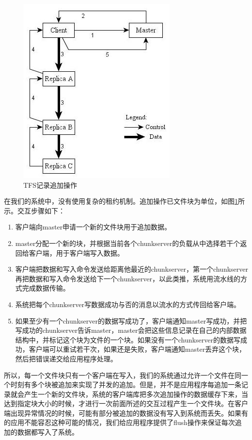 \documentclass[11pt,a4paper]{scrartcl} %
\begin{document}
\begin{CJK*}{UTF8}{gbsn}
\begin{figure}
  \centering
\includegraphics{tfs_write}  
  \caption{TFS记录追加操作}
  \label{fig:tfswrite}
\end{figure}
在我们的系统中，没有使用复杂的租约机制。追加操作已文件块为单位，如图\ref{fig:tfswrite}所示。交互步骤如下：
\begin{enumerate}
\item 客户端向master申请一个新的文件块用于追加数据。
\item master分配一个新的块，并根据当前各个chunkserver的负载从中选择若干个返回给客户端，用于客户端写入数据。
\item 客户端把数据和写入命令发送给距离他最近的chunkserver，第一个chunkserver再把数据和写入命令发送给下一个chunkserver，以此类推，系统用流水线的方式完成数据传输。
\item 系统把每个chunkserver写数据成功与否的消息以流水的方式传回给客户端。
\item 如果至少有一个chunkserver的数据写成功了，客户端通知master写成功，并把写成功的chunkserver告诉master，master会把这些信息记录在自己的内部数据结构中，并标记这个块为文件的一个块。如果没有一个chunkserver的数据写成功，客户端可以重试若干次，如果还是失败，客户端通知master丢弃这个块，然后把错误递交给应用程序处理。
\end{enumerate}
所以，每一个文件块只有一个客户端在写入，我们的系统通过允许一个文件在同一个时刻有多个块被追加来实现了并发的追加。但是，并不是应用程序每追加一条记录就会产生一个新的文件块，系统的客户端库把多次追加操作的数据缓存下来，当达到指定块大小的时候，才进行一次前面所述的交互过程产生一个文件块。在客户端出现异常情况的时候，可能有部分被追加的数据没有写入到系统而丢失。如果有的应用不能容忍这种可能的情况，我们给应用程序提供了flush操作来保证每次追加的数据都写入了系统。


\end{CJK*}
\end{document}
